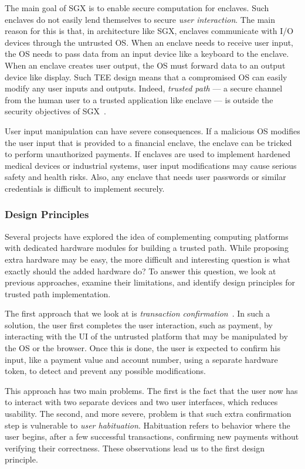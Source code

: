 \documentclass[letterpaper,twocolumn,10pt]{article}
\begin{document}
The main goal of SGX is to enable secure computation for enclaves. Such enclaves do not easily lend themselves to secure \emph{user interaction}. The main reason for this is that, in architecture like SGX, enclaves communicate with I/O devices through the untrusted OS. When an enclave needs to receive user input, the OS needs to pass data from an input device like a keyboard to the enclave. When an enclave creates user output, the OS must forward data to an output device like display. Such TEE design means that a compromised OS can easily modify any user inputs and outputs.
Indeed, \emph{trusted path} --- a secure channel from the human user to a trusted application like enclave --- is outside the security objectives of SGX~\cite{mckeen2013}. 

User input manipulation can have severe consequences. If a malicious OS modifies the user input that is provided to a financial enclave, the enclave can be tricked to perform unauthorized payments. If enclaves are used to implement hardened medical devices or industrial systems, user input modifications may cause serious safety and health risks. Also, any enclave that needs user passwords or similar credentials is difficult to implement securely.


\subsubsection*{Design Principles}

Several projects have explored the idea of complementing computing platforms with dedicated hardware modules for building a trusted path. While proposing extra hardware may be easy, the more difficult and interesting question is what exactly should the added hardware do? To answer this question, we look at previous approaches, examine their limitations, and identify design principles for trusted path implementation.
    
The first approach that we look at is \emph{transaction confirmation}~\cite{filyanov2011uni}. In such a solution, the user first completes the user interaction, such as payment, by interacting with the UI of the untrusted platform that may be manipulated by the OS or the browser. Once this is done, the user is expected to confirm his input, like a payment value and account number, using a separate hardware token, to detect and prevent any possible modifications.

This approach has two main problems. The first is the fact that the user now has to interact with two separate devices and two user interfaces, which reduces usability. The second, and more severe, problem is that such extra confirmation step is vulnerable to \emph{user habituation}. Habituation refers to behavior where the user begins, after a few successful transactions, confirming new payments without verifying their correctness. These observations lead us to the first design principle.  
\end{document}
